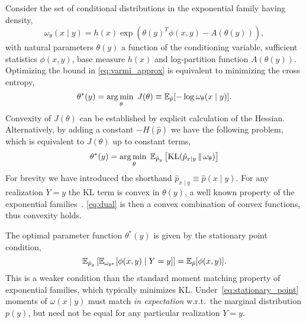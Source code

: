 Consider the set of conditional distributions in the exponential
family having density,
\begin{equation}
  \omega_\theta(x \mid y) = h(x)\exp\left( \theta(y)^T \phi(x,y) - A(\theta(y)) \right),
\end{equation}
with natural parameters $\theta(y)$ a function of the conditioning
variable, sufficient statistics $\phi(x,y)$, base measure $h(x)$ and
log-partition function $A(\theta(y))$.  Optimizing the bound
in \EQN\eqref{eq:varmi_approx} is equivalent to minimizing the cross
entropy,
\begin{equation}\label{eq:crossent}
  \theta^{*}(y) = \operatorname*{arg\,min\;}_{\theta} J(\theta) \equiv \mathbb{E}_{\hat{p}}[ - \log \omega_{\theta}(x \mid y) ].
\end{equation}
Convexity of $J(\theta)$ can be established by explicit calculation of
the Hessian.  Alternatively, by adding a constant \mbox{$-H(\hat{p})$}
we have the following problem, which is equivalent to $J(\theta)$ up
to constant terms,
\begin{equation}\label{eq:dual}
  \theta^*(y) = \operatorname*{arg\,min\;}_\theta \mathbb{E}_{\hat{p}_y}\left[ \mathrm{KL}(\hat{p}_{x\mid y}\,\|\,\omega_\theta) \right]
\end{equation}
For brevity we have introduced the shorthand \mbox{$\hat{p}_{x\mid
y} \equiv
\hat{p}(x\mid y)$}.  For any realization $Y=y$ the KL term is convex in
$\theta(y)$, a well known property of the exponential
families~\citep{wainwright_jordan}.  \EQN\eqref{eq:dual} is then a
convex combination of convex functions, thus convexity holds.

The optimal parameter function $\theta^{*}(y)$ is given by the
stationary point condition,
\begin{equation}\label{eq:stationary_point}
  \mathbb{E}_{\hat{p}_y}\left[ \mathbb{E}_{\omega_{\theta^{*}}}[ \phi(x,y) \mid Y=y ] \right] = \mathbb{E}_{\hat{p}}[\phi(x,y)].
\end{equation}
This is a weaker condition than the standard moment matching property
of exponential families, which typically minimizes KL.
Under~\eqref{eq:stationary_point} moments of $\omega(x\mid y)$ must
match \emph{in expectation} w.r.t.~the marginal distribution $p(y)$,
but need not be equal for any particular realization $Y=y$.


